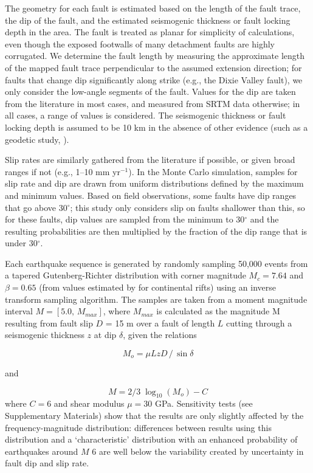 \documentclass[twocolumn,grl]{AGUTeX}
\begin{document}
\begin{article}
The geometry for each fault is estimated based on the length of the fault trace, the dip of the fault, and the estimated seismogenic thickness or fault locking depth in the area.  The fault is treated as planar for simplicity of calculations, even though the exposed footwalls of many detachment faults are highly corrugated.  We determine the fault length by measuring the approximate length of the mapped fault trace perpendicular to the assumed extension direction; for faults that change dip significantly along strike (e.g., the Dixie Valley fault), we only consider the low-angle segments of the fault.  Values for the dip are taken from the literature in most cases, and measured from SRTM data otherwise; in all cases, a range of values is considered.  The seismogenic thickness or fault locking depth is assumed to be 10 km in the absence of other evidence (such as a geodetic study, \citep [e.g.,][]{hreinsdottir2009altotib}).

Slip rates are similarly gathered from the literature if possible, or given broad ranges if not (e.g., 1--10 mm yr$^{-1}$).  In the Monte Carlo simulation, samples for slip rate and dip are drawn from uniform distributions defined by the maximum and minimum values.  Based on field observations, some faults have dip ranges that go above 30$^\circ$; this study only considers slip on faults shallower than this, so for these faults, dip values are sampled from the minimum to 30$^\circ$ and the resulting probabilities are then multiplied by the fraction of the dip range that is under 30$^\circ$.

Each earthquake sequence is generated by randomly sampling 50,000 events from a tapered Gutenberg-Richter distribution with corner magnitude $M_c = 7.64$ and $\beta = 0.65$ (from values estimated by \citet{birdkagan2004f_m} for continental rifts) using an inverse transform sampling algorithm.  The samples are taken from a moment magnitude interval $M = [5.0, \, M_{max}]$, where $M_{max}$ is calculated as the magnitude M resulting from fault slip $D$ = 15 m over a fault of length $L$ cutting through a seismogenic thickness $z$ at dip $\delta$, given the relations 

\begin{equation}
 M_o = \mu L z D \,/ \, \sin \delta 
 \end{equation}

and

\begin{equation}
M = 2/3 \; \log_{10} (M_o) - C 
\end{equation}
where $C = 6 $ and shear modulus $\mu = 30$ GPa.  Sensitivity tests (see Supplementary Materials) show that the results are only slightly affected by the frequency-magnitude distribution: differences between results using this distribution and a `characteristic' distribution with an enhanced probability of earthquakes around $M$ 6 are well below the variability created by uncertainty in fault dip and slip rate.  


\end{article}
\end{document}
